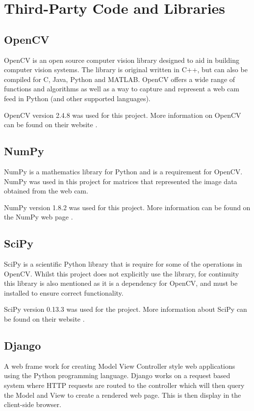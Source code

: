 \chapter{Third-Party Code and Libraries}
\section{OpenCV}

OpenCV is an open source computer vision library designed to aid in building computer vision systems. The library is original written in C++, but can also be compiled for C, Java, Python and MATLAB. OpenCV offers a wide range of functions and algorithms as well as a way to capture and represent a web cam feed in Python (and other supported languages).

OpenCV version 2.4.8 was used for this project. More information on OpenCV can be found on their website \cite{opencv}.

\section{NumPy}

NumPy is a mathematics library for Python and is a requirement for OpenCV. NumPy was used in this project for matrices that represented the image data obtained from the web cam. 

NumPy version 1.8.2 was used for this project. More information can be found on the NumPy web page \cite{numpy}.

\section{SciPy}
 
SciPy is a scientific Python library that is require for some of the operations in OpenCV. Whilst this project does not explicitly use the library, for continuity this library is also mentioned as it is a dependency for OpenCV, and must be installed to ensure correct functionality. 

SciPy version 0.13.3 was used for the project. More information about SciPy can be found on their website \cite{scipy}.


\section{Django}

A web frame work for creating Model View Controller style web applications using the Python programming language. Django works on a request based system where HTTP requests are routed to the controller which will then query the Model and View to create a rendered web page. This is then display in the client-side browser. 

